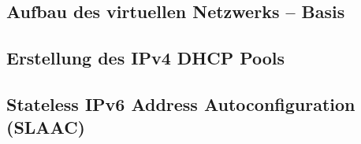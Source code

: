 \subsection{Aufbau des virtuellen Netzwerks – Basis}

\clearpage
\pagebreak
\subsection{Erstellung des IPv4 DHCP Pools}

\clearpage
\pagebreak
\subsection{Stateless IPv6 Address Autoconfiguration (SLAAC)}

